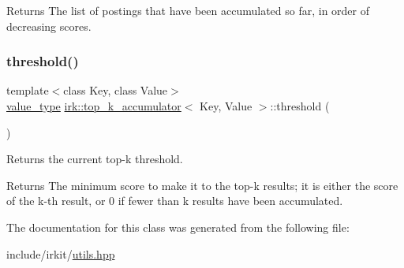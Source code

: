 \begin{DoxyReturn}{Returns}
The list of postings that have been accumulated so far, in order of decreasing scores. 
\end{DoxyReturn}
\mbox{\label{classirk_1_1top__k__accumulator_a70f24ee6364940d0ea95cb6aa9eca510}} 
\subsubsection{\texorpdfstring{threshold()}{threshold()}}
{\footnotesize\ttfamily template$<$class Key, class Value$>$ \\
\mbox{\hyperlink{classirk_1_1top__k__accumulator_ad96657e9478dcbab995f3bf38954b5bd}{value\+\_\+type}} \mbox{\hyperlink{classirk_1_1top__k__accumulator}{irk\+::top\+\_\+k\+\_\+accumulator}}$<$ Key, Value $>$\+::threshold (\begin{DoxyParamCaption}{ }\end{DoxyParamCaption})\hspace{0.3cm}{\ttfamily [inline]}}



Returns the current top-\/k threshold. 

\begin{DoxyReturn}{Returns}
The minimum score to make it to the top-\/k results; it is either the score of the k-\/th result, or 0 if fewer than k results have been accumulated. 
\end{DoxyReturn}


The documentation for this class was generated from the following file\+:\begin{DoxyCompactItemize}
\item 
include/irkit/\mbox{\hyperlink{utils_8hpp}{utils.\+hpp}}\end{DoxyCompactItemize}
